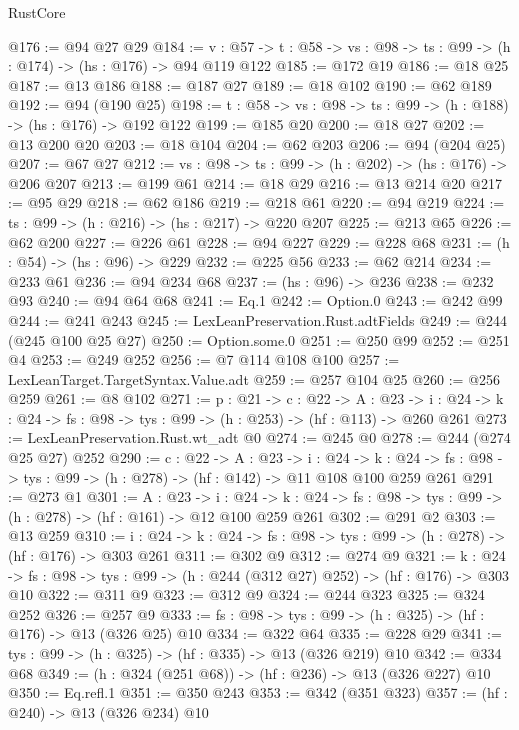 \begin{lexlean}{RustCore}
\begin{coremodule}
@176 := @94 @27 @29
@184 := {v : @57} ->
  {t : @58} -> {vs : @98} -> {ts : @99} -> (h : @174) -> (hs : @176) -> @94 @119 @122
@185 := @172 @19
@186 := @18 @25
@187 := @13 @186
@188 := @187 @27
@189 := @18 @102
@190 := @62 @189
@192 := @94 (@190 @25)
@198 := {t : @58} -> {vs : @98} -> {ts : @99} -> (h : @188) -> (hs : @176) -> @192 @122
@199 := @185 @20
@200 := @18 @27
@202 := @13 @200 @20
@203 := @18 @104
@204 := @62 @203
@206 := @94 (@204 @25)
@207 := @67 @27
@212 := {vs : @98} -> {ts : @99} -> (h : @202) -> (hs : @176) -> @206 @207
@213 := @199 @61
@214 := @18 @29
@216 := @13 @214 @20
@217 := @95 @29
@218 := @62 @186
@219 := @218 @61
@220 := @94 @219
@224 := {ts : @99} -> (h : @216) -> (hs : @217) -> @220 @207
@225 := @213 @65
@226 := @62 @200
@227 := @226 @61
@228 := @94 @227
@229 := @228 @68
@231 := (h : @54) -> (hs : @96) -> @229
@232 := @225 @56
@233 := @62 @214
@234 := @233 @61
@236 := @94 @234 @68
@237 := (hs : @96) -> @236
@238 := @232 @93
@240 := @94 @64 @68
@241 := Eq.{1}
@242 := Option.{0}
@243 := @242 @99
@244 := @241 @243
@245 := LexLeanPreservation.Rust.adtFields
@249 := @244 (@245 @100 @25 @27)
@250 := Option.some.{0}
@251 := @250 @99
@252 := @251 @4
@253 := @249 @252
@256 := @7 @114 @108 @100
@257 := LexLeanTarget.TargetSyntax.Value.adt
@259 := @257 @104 @25
@260 := @256 @259
@261 := @8 @102
@271 := {p : @21} ->
  {c : @22} ->
  {A : @23} ->
  {i : @24} -> {k : @24} -> {fs : @98} -> {tys : @99} -> (h : @253) -> (hf : @113) -> @260 @261
@273 := LexLeanPreservation.Rust.wt_adt @0
@274 := @245 @0
@278 := @244 (@274 @25 @27) @252
@290 := {c : @22} ->
  {A : @23} ->
  {i : @24} ->
  {k : @24} -> {fs : @98} -> {tys : @99} -> (h : @278) -> (hf : @142) -> @11 @108 @100 @259 @261
@291 := @273 @1
@301 := {A : @23} ->
  {i : @24} ->
  {k : @24} -> {fs : @98} -> {tys : @99} -> (h : @278) -> (hf : @161) -> @12 @100 @259 @261
@302 := @291 @2
@303 := @13 @259
@310 := {i : @24} ->
  {k : @24} -> {fs : @98} -> {tys : @99} -> (h : @278) -> (hf : @176) -> @303 @261
@311 := @302 @9
@312 := @274 @9
@321 := {k : @24} ->
  {fs : @98} -> {tys : @99} -> (h : @244 (@312 @27) @252) -> (hf : @176) -> @303 @10
@322 := @311 @9
@323 := @312 @9
@324 := @244 @323
@325 := @324 @252
@326 := @257 @9
@333 := {fs : @98} -> {tys : @99} -> (h : @325) -> (hf : @176) -> @13 (@326 @25) @10
@334 := @322 @64
@335 := @228 @29
@341 := {tys : @99} -> (h : @325) -> (hf : @335) -> @13 (@326 @219) @10
@342 := @334 @68
@349 := (h : @324 (@251 @68)) -> (hf : @236) -> @13 (@326 @227) @10
@350 := Eq.refl.{1}
@351 := @350 @243
@353 := @342 (@351 @323)
@357 := (hf : @240) -> @13 (@326 @234) @10

\end{coremodule}
\end{lexlean}
